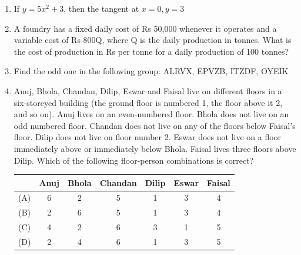 \documentclass[journal,12pt,onecolumn]{IEEEtran}
\theoremstyle{remark}
\begin{document}
\begin{enumerate}
\item If $y = 5x^2 + 3$, then the tangent at $x = 0, y = 3$
\hfill{} \begin{enumerate}  \end{enumerate}

\item A foundry has a fixed daily cost of Rs 50,000 whenever it operates and a variable cost of Rs 800Q, where Q is the daily production in tonnes. What is the cost of production in Rs per tonne for a daily production of 100 tonnes?

\item Find the odd one in the following group: ALRVX, EPVZB, ITZDF, OYEIK
\hfill{} \begin{enumerate}  \end{enumerate}

\item Anuj, Bhola, Chandan, Dilip, Eswar and Faisal live on different floors in a six-storeyed building (the ground floor is numbered 1, the floor above it 2, and so on). Anuj lives on an even-numbered floor. Bhola does not live on an odd numbered floor. Chandan does not live on any of the floors below Faisal's floor. Dilip does not live on floor number 2. Eswar does not live on a floor immediately above or immediately below Bhola. Faisal lives three floors above Dilip. Which of the following floor-person combinations is correct?
\begin{center}
    \begin{tabular}{|c|c|c|c|c|c|c|}
    \hline
        & Anuj & Bhola & Chandan & Dilip & Eswar & Faisal \\
        \hline
        (A) & 6 & 2 & 5 & 1 & 3 & 4 \\
        \hline
        (B) & 2 & 6 & 5 & 1 & 3 & 4 \\
        \hline
        (C) & 4 & 2 & 6 & 3 & 1 & 5 \\
        \hline
        (D) & 2 & 4 & 6 & 1 & 3 & 5 \\
        \hline
    \end{tabular}
\end{center}


\end{enumerate}
\end{document}
